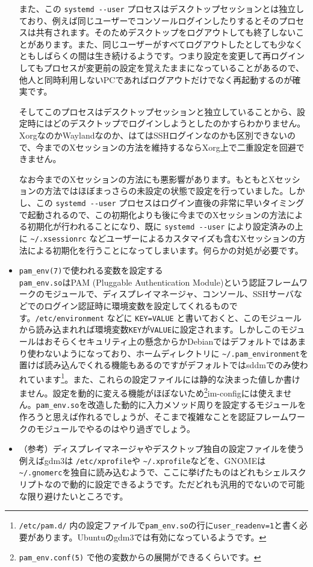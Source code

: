 \documentclass[mingoth,a4paper]{jsarticle}
\begin{document}
\begin{itemize}
また、この \verb|systemd --user| プロセスはデスクトップセッションとは独立しており、例えば同じユーザーでコンソールログインしたりするとそのプロセスは共有されます。そのためデスクトップをログアウトしても終了しないことがあります。また、同じユーザーがすべてログアウトしたとしても少なくともしばらくの間は生き続けるようです。つまり設定を変更して再ログインしてもプロセスが変更前の設定を覚えたままになっていることがあるので、他人と同時利用しないPCであればログアウトだけでなく再起動するのが確実です。

そしてこのプロセスはデスクトップセッションと独立していることから、設定時にはどのデスクトップでログインしようとしたのかすらわかりません。XorgなのかWaylandなのか、はてはSSHログインなのかも区別できないので、今までのXセッションの方法を維持するならXorg上で二重設定を回避できません。

なお今までのXセッションの方法にも悪影響があります。もともとXセッションの方法ではほぼまっさらの未設定の状態で設定を行っていました。しかし、この \verb|systemd --user| プロセスはログイン直後の非常に早いタイミングで起動されるので、この初期化よりも後に今までのXセッションの方法による初期化が行われることになり、既に \verb|systemd --user| により設定済みの上に \verb|~/.xsessionrc| などユーザーによるカスタマイズも含むXセッションの方法による初期化を行うことになってしまいます。何らかの対処が必要です。
 \item \verb|pam_env(7)|で使われる変数を設定する\\
\verb|pam_env.so|はPAM (Pluggable Authentication Module)という認証フレームワークのモジュールで、ディスプレイマネージャ、コンソール、SSHサーバなどでのログイン認証時に環境変数を設定してくれるものです。\verb|/etc/environment| などに \verb|KEY=VALUE| と書いておくと、このモジュールから読み込まれれば環境変数\verb|KEY|が\verb|VALUE|に設定されます。しかしこのモジュールはおそらくセキュリティ上の懸念からかDebianではデフォルトではあまり使わないようになっており、ホームディレクトリに \verb|~/.pam_environment|を置けば読み込んでくれる機能もあるのですがデフォルトではsddmでのみ使われています\footnote{\texttt{/etc/pam.d/} 内の設定ファイルで\texttt{pam\_env.so}の行に\texttt{user\_readenv=1}と書く必要があります。Ubuntuのgdm3では有効になっているようです。}。また、これらの設定ファイルには静的な決まった値しか書けません。設定を動的に変える機能がほぼないため\footnote{\texttt{pam\_env.conf(5)} で他の変数からの展開ができるくらいです。}im-configには使えません。\verb|pam_env.so|を改造した動的に入力メソッド周りを設定するモジュールを作ろうと思えば作れるでしょうが、そこまで複雑なことを認証フレームワークのモジュールでやるのはやり過ぎでしょう。
 \item （参考）ディスプレイマネージャやデスクトップ独自の設定ファイルを使う\\
例えばgdm3は \verb|/etc/xprofile|や \verb|~/.xprofile|などを、GNOMEは \verb|~/.gnomerc|を独自に読み込むようで、ここに挙げたものはどれもシェルスクリプトなので動的に設定できるようです。ただどれも汎用的でないので可能な限り避けたいところです。
\end{itemize}
\end{document}
